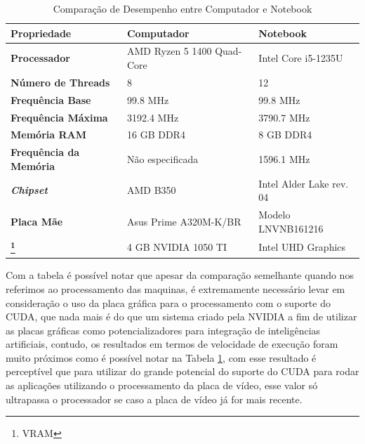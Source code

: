 \begin{table}[h!]
	\caption{Comparação de Desempenho entre Computador e Notebook}
	\centering
	\begin{tabular}{|p{4cm}|p{5cm}|p{5cm}|}
	\hline
	\textbf{Propriedade}         & \textbf{Computador}                & \textbf{Notebook}                     \\ \hline
	\textbf{Processador}          & AMD Ryzen 5 1400 Quad-Core        & Intel Core i5-1235U                   \\ \hline
	\textbf{Número de Threads}    & 8                                 & 12                                    \\ \hline
	\textbf{Frequência Base}      & 99.8 MHz                          & 99.8 MHz                              \\ \hline
	\textbf{Frequência Máxima}    & 3192.4 MHz                        & 3790.7 MHz                            \\ \hline
	\textbf{Memória RAM}          & 16 GB DDR4                        & 8 GB DDR4                             \\ \hline
	\textbf{Frequência da Memória}& Não especificada                  & 1596.1 MHz                            \\ \hline
	\textbf{\textit{Chipset}}     & AMD B350                          & Intel Alder Lake rev. 04              \\ \hline
	\textbf{Placa Mãe}            & Asus Prime A320M-K/BR             & Modelo LNVNB161216                    \\ \hline
	\textbf{\footnote{VRAM}}      & 4 GB NVIDIA 1050 TI               & Intel UHD Graphics                    \\ \hline
	\end{tabular}
	\label{tab:comparacao_desempenho}
\end{table}

Com a tabela é possível notar que apesar da comparação semelhante quando nos referimos ao processamento das maquinas, é extremamente necessário levar em consideração o uso da placa gráfica para o processamento com o suporte do CUDA, que nada mais é do que um sistema criado pela NVIDIA a fim de utilizar as placas gráficas como potencializadores para integração de inteligências artificiais, contudo, os resultados em termos de velocidade de execução foram muito próximos como é possível notar na Tabela \ref{tab:comparacao_desempenho}, com esse resultado é perceptível que para utilizar do grande potencial do suporte do CUDA para rodar as aplicações utilizando o processamento da placa de vídeo, esse valor só ultrapassa o processador se caso a placa de vídeo já for mais recente.

